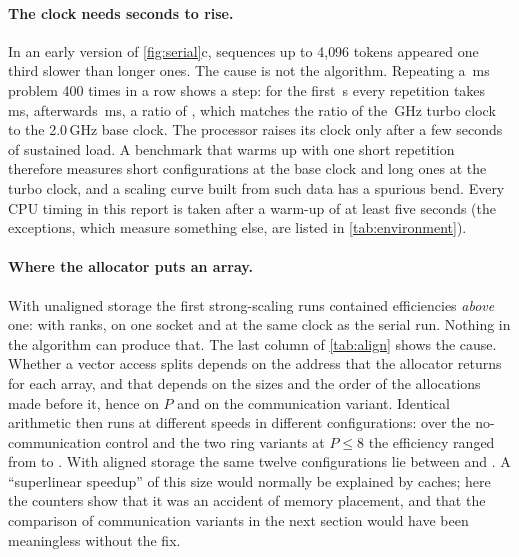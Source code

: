\paragraph{The clock needs seconds to rise.}\label{sec:ramp}
In an early version of \cref{fig:serial}c, sequences up to 4{,}096 tokens appeared
one third slower than longer ones. The cause is not the algorithm. Repeating a
\,ms problem 400 times in a row shows a step: for the first
\,s every repetition takes \,ms, afterwards
\,ms, a ratio of , which matches the ratio of the
\,GHz turbo clock to the 2.0\,GHz base clock. The processor raises its clock only after a
few seconds of sustained load. A benchmark that warms up with one short repetition
therefore measures short configurations at the base clock and long ones at the
turbo clock, and a scaling curve built from such data has a spurious bend. Every
CPU timing in this report is taken after a warm-up of at least five seconds (the
exceptions, which measure something else, are listed in \cref{tab:environment}).

\paragraph{Where the allocator puts an array.}\label{sec:alignment}
With unaligned storage the first strong-scaling runs contained efficiencies
\emph{above} one:  with  ranks, on one socket and
at the same clock as the serial run. Nothing in the algorithm can produce that. The
last column of \cref{tab:align} shows the cause. Whether a vector access splits
depends on the address that the allocator returns for each array, and that depends
on the sizes and the order of the allocations made before it, hence on $P$ and on
the communication variant. Identical arithmetic then runs at different speeds in
different configurations: over the no-communication control and the two ring
variants at $P\le 8$ the efficiency ranged from  to
. With aligned storage the same twelve configurations lie between
 and . A ``superlinear speedup'' of this size
would normally be explained by caches; here the counters show that it was an
accident of memory placement, and that the comparison of communication variants in
the next section would have been meaningless without the fix.
